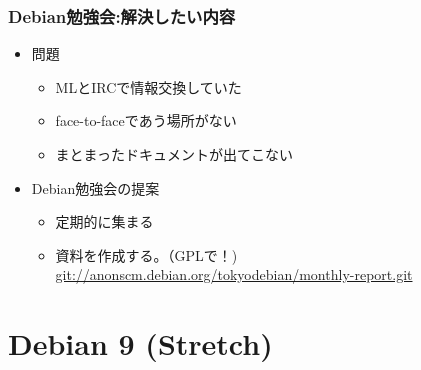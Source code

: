 \documentclass[cjk,c,squeeze,shrink,dvipdfmx,12pt]{beamer}
\begin{document}
\begin{frame}

  \frametitle{Debian勉強会:解決したい内容}
  \begin{itemize}[<+->]
  \item 問題
    \begin{itemize}
    \item MLとIRCで情報交換していた
    \item face-to-faceであう場所がない
    \item まとまったドキュメントが出てこない
    \end{itemize}
  \item Debian勉強会の提案
    \begin{itemize}
    \item 定期的に集まる
    \item 資料を作成する。（GPLで！) \\
      {\small \url{git://anonscm.debian.org/tokyodebian/monthly-report.git}}
    \end{itemize}
  \end{itemize}

\end{frame}
\fi

\section{Debian 9 (Stretch)}
\end{document}
